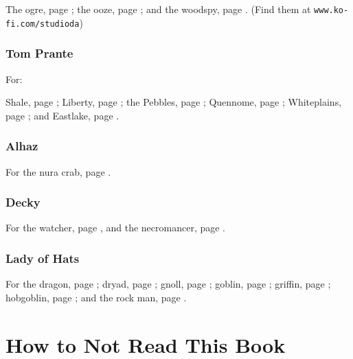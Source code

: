 \begin{multicols}{2}
The ogre, page \pageref{da:ogre};
the ooze, page \pageref{Studio_DA/jelly};
and the woodspy, page \pageref{Studio_DA/woodspy}.
(Find them at {\tt www.ko-fi.com/studioda})

\subsubsection{Tom Prante}

For:

Shale, page \pageref{Tom_Prante/autumn};
Liberty, page \pageref{Tom_Prante/swamp};
the Pebbles, page \pageref{Tom_Prante/ancient_valley};
Quennome, page \pageref{Tom_Prante/the_old_path};
Whiteplains, page \pageref{Tom_Prante/inaok};
and
Eastlake, page \pageref{Tom_Prante/winter}.

\subsubsection{Alhaz}

For the nura crab, page \pageref{Alhaz/crab}.

\subsubsection{Decky}

For the watcher, page \pageref{Decky/watcher},
and the necromancer, page \pageref{Decky/necromancer}.

\subsubsection{Lady of Hats}

For the 
dragon, page \pageref{loh/dragon};
dryad, page \pageref{loh/dryad};
gnoll, page \pageref{loh/gnoll};
goblin, page \pageref{loh/goblin};
griffin, page \pageref{loh/griffin};
hobgoblin, page \pageref{loh/hobgoblin};
and
the rock man, page \pageref{loh/rockman}.

\end{multicols}

\section*{How to Not Read This Book}

